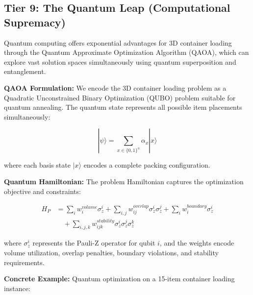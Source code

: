 \documentclass{article}
\begin{document}
\subsection{Tier 9: The Quantum Leap (Computational Supremacy)}

Quantum computing offers exponential advantages for 3D container loading through the Quantum Approximate Optimization Algorithm (QAOA), which can explore vast solution spaces simultaneously using quantum superposition and entanglement.

\textbf{QAOA Formulation:}
We encode the 3D container loading problem as a Quadratic Unconstrained Binary Optimization (QUBO) problem suitable for quantum annealing. The quantum state represents all possible item placements simultaneously:

\[|\psi\rangle = \sum_{x \in \{0,1\}^n} \alpha_x |x\rangle\]

where each basis state $|x\rangle$ encodes a complete packing configuration.

\textbf{Quantum Hamiltonian:}
The problem Hamiltonian captures the optimization objective and constraints:

\begin{align}
H_P &= \sum_{i} w_i^{volume} \sigma_z^i + \sum_{i,j} w_{ij}^{overlap} \sigma_z^i \sigma_z^j + \sum_{i} w_i^{boundary} \sigma_z^i\\
&\quad + \sum_{i,j,k} w_{ijk}^{stability} \sigma_z^i \sigma_z^j \sigma_z^k
\end{align}

where $\sigma_z^i$ represents the Pauli-Z operator for qubit $i$, and the weights encode volume utilization, overlap penalties, boundary violations, and stability requirements.

\textbf{Concrete Example:} Quantum optimization on a 15-item container loading instance:
\end{document}
